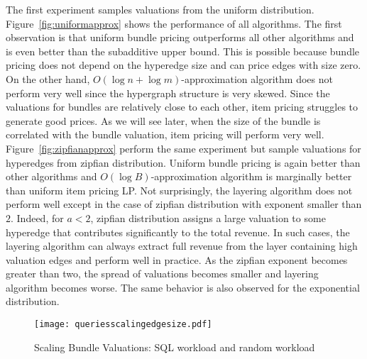 \smallskip
{} The first experiment samples valuations from the uniform distribution. Figure~\ref{fig:uniformapprox} shows the performance of all algorithms. The first observation is that uniform bundle pricing outperforms all other algorithms and is even better than the subadditive upper bound. This is possible because bundle pricing does not depend on the hyperedge size and can price edges with size zero. On the other hand, $O(\log n+\log m)$-approximation algorithm does not perform very well since the hypergraph structure is very skewed. Since the valuations for bundles are relatively close to each other, item pricing struggles to generate good prices. As we will see later, when the size of the bundle is correlated with the bundle valuation, item pricing will perform very well.  Figure~\ref{fig:zipfianapprox} perform the same experiment but sample valuations for hyperedges from zipfian distribution. Uniform bundle pricing is again better than other algorithms and $O(\log B)$-approximation algorithm is marginally better than uniform item pricing LP. Not surprisingly, the layering algorithm does not perform well except in the case of zipfian distribution with exponent smaller than $2$. Indeed, for $a < 2$, zipfian distribution assigns a large valuation to some hyperedge that contributes significantly to the total revenue. In such cases, the layering algorithm can always extract full revenue from the layer containing high valuation edges and perform well in practice. As the zipfian exponent becomes greater than two, the spread of valuations becomes smaller and layering algorithm becomes worse. The same behavior is also observed for the exponential distribution. 

\begin{figure}[!t]
	\centering
	\texttt{[image: queriesscalingedgesize.pdf]}
	\caption{Scaling Bundle Valuations: SQL workload and random workload} \label{fig:scalingedge}
\end{figure}  

